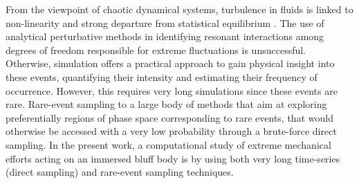 \documentclass{jfm}
\newcommand{\EL}[1]{{\color{myred}{#1}}}
\begin{document}
From the viewpoint of chaotic dynamical systems, turbulence in fluids is linked to non-linearity and strong departure from statistical equilibrium \citep{KRAICHNAN}.
The use of analytical perturbative methods in identifying resonant interactions among degrees of freedom responsible for extreme fluctuations is unsuccessful.
Otherwise, simulation offers a practical approach to gain physical insight into these events, quantifying their intensity and estimating their frequency of occurrence.
However, this requires very long simulations since these events are rare.
%
{Rare-event sampling \EL{refers} to a large body of methods that aim at exploring preferentially regions of phase space corresponding to rare events, that would otherwise be accessed with a very low probability through a brute-force direct sampling.}
%
In the present work, a computational study of extreme mechanical efforts acting on an immersed bluff body is \EL{conducted} by using both very long time-series (direct sampling) and rare-event sampling techniques.
%
\end{document}
